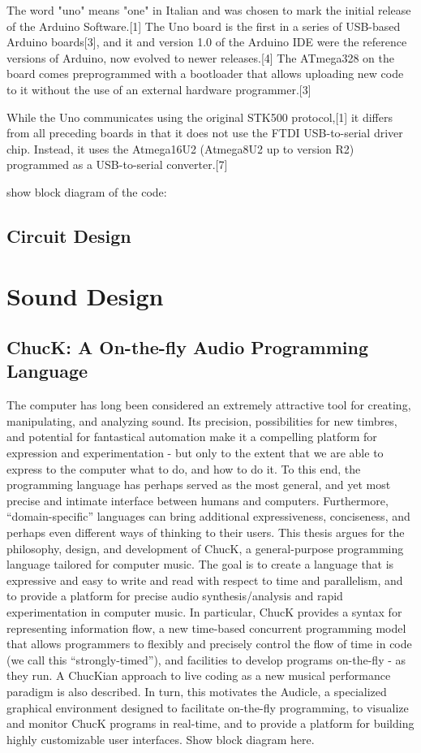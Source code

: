 The word "uno" means "one" in Italian and was chosen to mark the initial release of the 
Arduino Software.[1] The Uno board is the first in a series of USB-based Arduino boards[3], 
and it and version 1.0 of the Arduino IDE were the reference versions of Arduino, now evolved 
to newer releases.[4] The ATmega328 on the board comes preprogrammed with a bootloader 
that allows uploading new code to it without the use of an external hardware programmer.[3]

While the Uno communicates using the original STK500 protocol,[1] it differs from all 
preceding boards in that it does not use the FTDI USB-to-serial driver chip. Instead, 
it uses the Atmega16U2 (Atmega8U2 up to version R2) programmed as a USB-to-serial converter.[7]

show block diagram of the code:

\subsection{Circuit Design}

\section{Sound Design}

\subsection{ChucK: A On-the-fly Audio Programming Language}
The computer has long been considered an extremely attractive tool for creating,
manipulating, and analyzing sound. Its precision, possibilities for new timbres, and
potential for fantastical automation make it a compelling platform for expression
and experimentation - but only to the extent that we are able to express to the
computer what to do, and how to do it. To this end, the programming language
has perhaps served as the most general, and yet most precise and intimate interface
between humans and computers. Furthermore, “domain-specific” languages can
bring additional expressiveness, conciseness, and perhaps even different ways of
thinking to their users.
This thesis argues for the philosophy, design, and development of ChucK, a
general-purpose programming language tailored for computer music. The goal is to
create a language that is expressive and easy to write and read with respect to time
and parallelism, and to provide a platform for precise audio synthesis/analysis and
rapid experimentation in computer music. In particular, ChucK provides a syntax
for representing information flow, a new time-based concurrent programming model
that allows programmers to flexibly and precisely control the flow of time in code (we
call this “strongly-timed”), and facilities to develop programs on-the-fly - as they
run. A ChucKian approach to live coding as a new musical performance paradigm is
also described. In turn, this motivates the Audicle, a specialized graphical environment 
designed to facilitate on-the-fly programming, to visualize and monitor ChucK
programs in real-time, and to provide a platform for building highly customizable
user interfaces.
Show block diagram here.